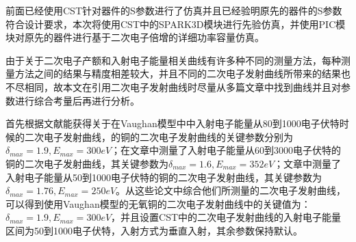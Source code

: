 \documentclass[master]{thesis-uestc}
\begin{document}
前面已经使用CST针对器件的S参数进行了仿真并且已经验明原先的器件的S参数符合设计要求，本次将使用CST中的SPARK3D模块进行先验仿真，并使用PIC模块对原先的器件进行基于二次电子倍增的详细功率容量仿真。

由于关于二次电子产额和入射电子能量相关曲线有许多种不同的测量方法，每种测量方法之间的结果与精度相差较大，并且不同的二次电子发射曲线所带来的结果也不尽相同，故本文在引用二次电子发射曲线时尽量从多篇文章中找到曲线并且对参数进行综合考量后再进行分析。

首先根据文献\cite{valizadeh_2014_wja}能获得关于在Vaughan模型中中入射电子能量从80到1000电子伏特时候的二次电子发射曲线，的铜的二次电子发射曲线的关键参数分别为$\delta_{max}=1.9, E_{max}=300 eV$；在文章\cite{bojko_2020_see}中测量了入射电子能量从60到3000电子伏特的铜的二次电子发射曲线，其关键参数为$\delta_{max}=1.6, E_{max}=352 eV$；文章\cite{jianweifang_lizi_2023}中测量了入射电子能量从50到1000电子伏特的铜的二次电子发射曲线，其关键参数为$\delta_{max}=1.76, E_{max}=250 eV$。从这些论文中综合他们所测量的二次电子发射曲线，可以得到使用Vaughan模型的无氧铜的二次电子发射曲线中的关键值为：$\delta_{max}=1.9, E_{max}=300 eV$，并且设置CST中的二次电子发射曲线的入射电子能量区间为50到1000电子伏特，入射方式为垂直入射，其余参数保持默认。
\end{document}
